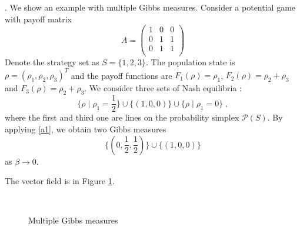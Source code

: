 \documentclass[11pt,reqno]{amsart}
\begin{document}
. 
We show an example with multiple Gibbs measures. 
Consider a potential game with payoff matrix
\begin{equation*}
A=\begin{pmatrix}
1&0& 0\\
0&1&1\\
0&1&1\\
\end{pmatrix}
\end{equation*}
Denote the strategy set as $S=\{1, 2, 3\}$. The population state is
$\rho=(\rho_1,\rho_2,\rho_3)^T$ and the payoff functions are $F_1(\rho)=\rho_1$,
$F_2(\rho)=\rho_2+\rho_3$ and $F_3(\rho)=\rho_2+\rho_3$. 
We consider three sets of Nash equilibria :   
\begin{equation*}
\{\rho\mid \rho_1=\frac{1}{2}\}\cup \{(1,0,0)\}\cup \{\rho\mid\rho_1=0\}\ ,
\end{equation*}
where the first and third one are lines on the probability simplex $\mathcal{P}(S)$. 
By applying \eqref{a1}, we obtain two Gibbs measures
\begin{equation*}
\{(0,\frac{1}{2},\frac{1}{2})\} \cup \{ (1,0,0)\}
\end{equation*}
as $\beta\rightarrow 0$.
 
 The vector field is in Figure \ref{multiple-gibbs}.
\begin{figure}[t!]
 \hspace{1cm}
 \\
\caption{Multiple Gibbs measures}
\label{multiple-gibbs}
\end{figure}
\end{document}
